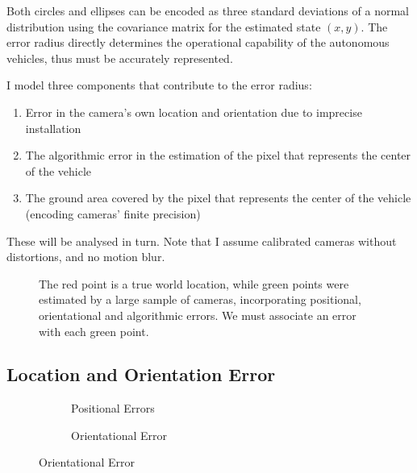 \documentclass[a4paper,12pt,twoside,openright]{report}
\begin{document}
Both circles and ellipses can be encoded as three standard deviations of a normal distribution
using the covariance matrix for the estimated state $(x,y)$. The error radius directly determines
the operational capability of the autonomous vehicles, thus must be accurately represented.

I model three components that contribute to the error radius:
\begin{enumerate}
    \item Error in the camera's own location and orientation due to imprecise installation
    \item The algorithmic error in the estimation of the pixel that represents the center of the vehicle
    \item The ground area covered by the pixel that represents the center of the vehicle (encoding cameras' finite precision)
\end{enumerate}
 
These will be analysed in turn. Note that I assume calibrated cameras without distortions, and no motion blur.


\begin{figure}[htb]
    \begin{center}
        
    \end{center}
    \caption[Example Predictions about a World Point]{The red point is a true world location, while green points were
    estimated by a large sample of cameras, incorporating positional, orientational and algorithmic errors. We must associate an error with each green point.}
    \label{fig:camera:dist}
\end{figure}



\subsection{Location and Orientation Error}
\begin{figure}[htb]
\centering
\begin{subfigure}[b]{.45\textwidth}
  \centering
  \resizebox{\linewidth}{!}{} 
  \caption{Positional Errors}
  \label{fig:camera:xyz error}
\end{subfigure}%
\begin{subfigure}[b]{.45\textwidth}
  \centering
  \resizebox{\linewidth}{!}{}
  \caption{Orientational Error}
  \label{fig:camera:orient error}
\end{subfigure}
\label{fig:camera:errors}
\end{figure}
\end{document}

